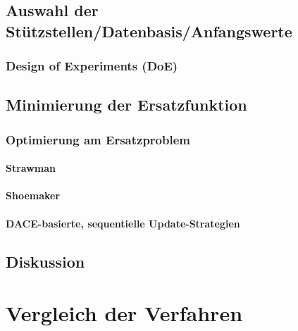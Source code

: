         \subsection{Auswahl der Stützstellen/Datenbasis/Anfangswerte} %

            \subsubsection{Design of Experiments (DoE)} %

        \subsection{Minimierung der Ersatzfunktion} %

            \subsubsection{Optimierung am Ersatzproblem} %

                \paragraph{Strawman} %

                \paragraph{Shoemaker} %

                \paragraph{DACE-basierte, sequentielle Update-Strategien} %

        \subsection{Diskussion} %

    \section{Vergleich der Verfahren} %

